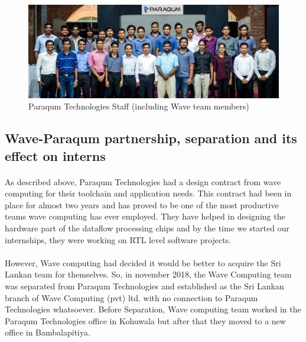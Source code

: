 \begin{figure}[h]
    \centering
    \includegraphics[trim=0cm 0cm 0cm 0cm, clip=true,scale=0.25]{figures/paraqum_team.jpg}
    \caption{Paraqum Technologies Staff (including Wave team members)~\cite{pqmintro} \label{Fig:pqmteam}}\vspace{-4mm}
    \end{figure}

\subsection{Wave-Paraqum partnership, separation and its effect on interns}

\paragraph{}
As described above, Paraqum Technologies had a design contract from wave computing for their toolchain and application needs. This contract had been in place for almost two years and has proved to be one of the most productive teams wave computing has ever employed. They have helped in designing the hardware part of the dataflow processing chips and by the time we started our internships, they were working on RTL level software projects.

\paragraph{}
However, Wave computing had decided it would be better to acquire the Sri Lankan team for themselves. So, in november 2018, the Wave Computing team was separated from Paraqum Technologies and established as the Sri Lankan branch of Wave Computing (pvt) ltd. with no connection to Paraqum Technologies whatsoever. Before Separation, Wave computing team worked in the Paraqum Technologies office in Kohuwala but after that they moved to a new office in Bambalapitiya.

